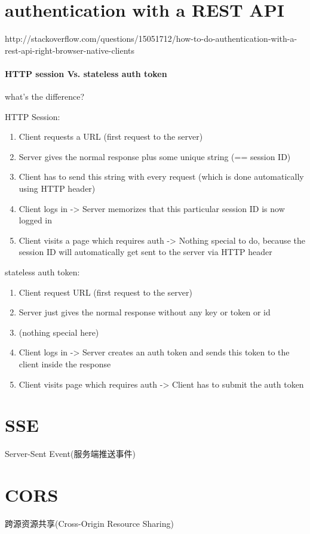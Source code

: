 \section{authentication with a REST API}
http://stackoverflow.com/questions/15051712/how-to-do-authentication-with-a-rest-api-right-browser-native-clients

\paragraph{HTTP session Vs. stateless auth token} what's the difference?

HTTP Session:

\begin{enumerate}
\item Client requests a URL (first request to the server)
\item Server gives the normal response plus some unique string (== session ID)
\item Client has to send this string with every request (which is done automatically using HTTP header)
\item Client logs in -> Server memorizes that this particular session ID is now logged in
\item Client visits a page which requires auth -> Nothing special to do, because the session ID will automatically get sent to the server via HTTP header
\end{enumerate}

stateless auth token:

\begin{enumerate}
\item Client request URL (first request to the server)
\item Server just gives the normal response without any key or token or id
\item (nothing special here)
\item Client logs in -> Server creates an auth token and sends this token to the client inside the response
\item Client visits page which requires auth -> Client has to submit the auth token
\end{enumerate}


\section{SSE} Server-Sent Event(服务端推送事件)

\section{CORS} 跨源资源共享(Cross-Origin Resource Sharing)


